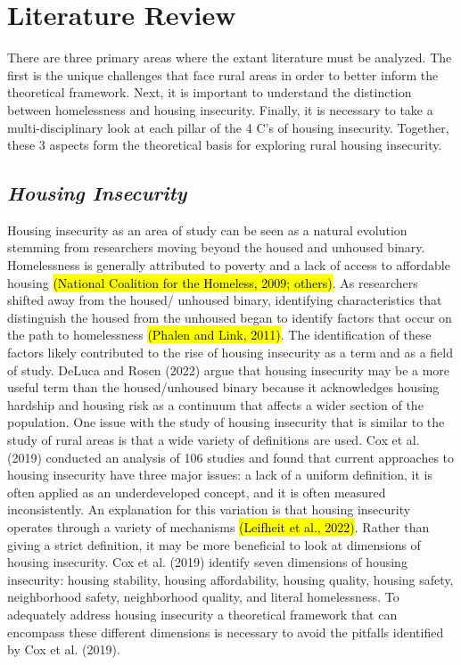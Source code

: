 \chapter{Literature Review}	%
There are three primary areas where the extant literature must be analyzed. The first is the unique challenges that face rural areas in order to better inform the theoretical framework. Next, it is important to understand the distinction between homelessness and housing insecurity. Finally, it is necessary to take a multi-disciplinary look at each pillar of the 4 C's of housing insecurity. Together, these 3 aspects form the theoretical basis for exploring rural housing insecurity.

\section{\textit{Housing Insecurity}}

Housing insecurity as an area of study can be seen as a natural evolution stemming from researchers moving beyond the housed and unhoused binary.  Homelessness is generally attributed to poverty and a lack of access to affordable housing \hl{(National Coalition for the Homeless, 2009; others)}.  As researchers shifted away from the housed/ unhoused binary, identifying characteristics that distinguish the housed from the unhoused began to identify factors that occur on the path to homelessness \hl{(Phalen and Link, 2011)}.  The identification of these factors likely contributed to the rise of housing insecurity as a term and as a field of study.  DeLuca and Rosen (2022) argue that housing insecurity may be a more useful term than the housed/unhoused binary because it acknowledges housing hardship and housing risk as a continuum that affects a wider section of the population.  One issue with the study of housing insecurity that is similar to the study of rural areas is that a wide variety of definitions are used. Cox et al. (2019) conducted an analysis of 106 studies and found that current approaches to housing insecurity have three major issues: a lack of a uniform definition, it is often applied as an underdeveloped concept, and it is often measured inconsistently. An explanation for this variation is that housing insecurity operates through a variety of mechanisms \hl{(Leifheit et al., 2022)}.  Rather than giving a strict definition, it may be more beneficial to look at dimensions of housing insecurity. Cox et al. (2019) identify seven dimensions of housing insecurity: housing stability, housing affordability, housing quality, housing safety, neighborhood safety, neighborhood quality, and literal homelessness. To adequately address housing insecurity a theoretical framework that can encompass these different dimensions is necessary to avoid the pitfalls identified by Cox et al. (2019). 

